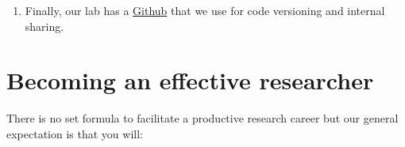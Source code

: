 \documentclass[
]{book}
\providecommand{\tightlist}{%
  \setlength{\itemsep}{0pt}\setlength{\parskip}{0pt}}
\begin{document}
\begin{enumerate}
\def\labelenumi{\arabic{enumi}.}
\setcounter{enumi}{7}
\tightlist
\item
  Finally, our lab has a \href{https://github.com/LippmannLab}{Github} that we use for code versioning and internal sharing.
\end{enumerate}

\hypertarget{becoming-an-effective-researcher}{%
\section{Becoming an effective researcher}\label{becoming-an-effective-researcher}}

There is no set formula to facilitate a productive research career but our general expectation is that you will:
\end{document}

